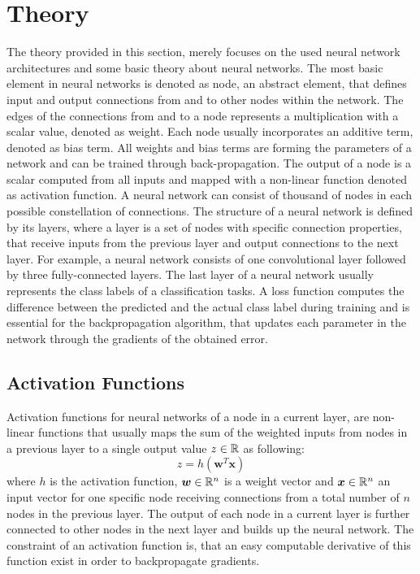 
\section{Theory}\label{sec:nn_theory}
\thesisStateRevised
\thesisStateNew
The theory provided in this section, merely focuses on the used neural network architectures and some basic theory about neural networks.
The most basic element in neural networks is denoted as node, an abstract element, that defines input and output connections from and to other nodes within the network.
The edges of the connections from and to a node represents a multiplication with a scalar value, denoted as weight.
Each node usually incorporates an additive term, denoted as bias term.
All weights and bias terms are forming the parameters of a network and can be trained through back-propagation.
The output of a node is a scalar computed from all inputs and mapped with a non-linear function denoted as activation function.
A neural network can consist of thousand of nodes in each possible constellation of connections.
The structure of a neural network is defined by its layers, where a layer is a set of nodes with specific connection properties, that receive inputs from the previous layer and output connections to the next layer.
For example, a neural network consists of one convolutional layer followed by three fully-connected layers.
The last layer of a neural network usually represents the class labels of a classification tasks.
A loss function computes the difference between the predicted and the actual class label during training and is essential for the backpropagation algorithm, that updates each parameter in the network through the gradients of the obtained error.



\subsection{Activation Functions}\label{sec:nn_theory_acti}
Activation functions for neural networks of a node in a current layer, are non-linear functions that usually maps the sum of the weighted inputs from nodes in a previous layer to a single output value $z \in \mathbb{R}$ as following:
\begin{equation}\label{eq:nn_theory_acti}
  z = h(\bm{w}^T \bm{x})
\end{equation}
where $h$ is the activation function, $\bm{w} \in \mathbb{R}^n$ is a weight vector and $\bm{x} \in \mathbb{R}^n$ an input vector for one specific node receiving connections from a total number of $n$ nodes in the previous layer.
The output of each node in a current layer is further connected to other nodes in the next layer and builds up the neural network.
The constraint of an activation function is, that an easy computable derivative of this function exist in order to backpropagate gradients.


